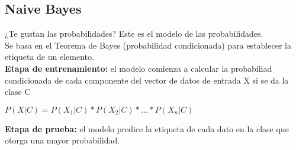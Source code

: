 \documentclass[]{article}
\begin{document}
\newpage
\subsection{Naive Bayes}

¿Te gustan las probabilidades? Este es el modelo de las probabilidades.\\

Se basa en el Teorema de Bayes (probabilidad condicionada) para establecer la etiqueta de un elemento.\\

\textbf{Etapa de entrenamiento: } el modelo comienza a calcular la probabiliad condicionada de cada componente del vector de datos de entrada X si se da la clase C

\begin{center}
$ P(X|C) = P(X_{1}|C) * P(X_{2}|C) * ... * P(X_{n}|C) $
\end{center}

\textbf{Etapa de prueba: } el modelo predice la etiqueta de cada dato en la clase que otorga una mayor probabilidad.
\end{document}
